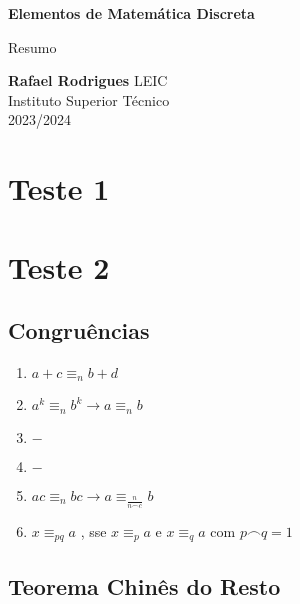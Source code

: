 \documentclass[11pt, a4paper]{article}
\begin{document}
\begin{titlepage}
    \begin{center}
        \vspace*{1cm}

        \textbf{\LARGE Elementos de Matemática Discreta}
        \vspace{0.5cm}

        \Large Resumo
        \vspace{1.5cm}

        \textbf{Rafael Rodrigues}
        \vfill
        LEIC \\
        Instituto Superior Técnico \\
        2023/2024
    \end{center}
\end{titlepage}

\tableofcontents

\newpage

\section{Teste 1}


\section{Teste 2}

\subsection*{Congruências}

\begin{enumerate}
    \item $a + c \equiv_n b + d$
    \item $a^k \equiv_n b^k \rightarrow a \equiv_n b$
    \item $-$
    \item $-$
    \item $\displaystyle ac \equiv_n bc \rightarrow
              a \equiv_{\frac{n}{n \frown c}} b$
    \item $x \equiv_{pq} a$ , sse  $x \equiv_p a$ e $x \equiv_q a$
          com $p \frown q = 1$
\end{enumerate}

\subsection{Teorema Chinês do Resto}
\end{document}
